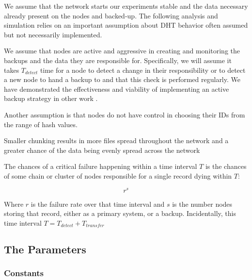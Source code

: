 
We assume that the network starts our experiments stable and the data necessary already present on the nodes and backed-up.
The following analysis and simulation relies on an important assumption about DHT behavior often assumed but not necessarily implemented.

We assume that nodes are active and aggressive in creating and monitoring the backups and the data they are responsible for.
Specifically, we will assume it takes  $T_{detect}$ time for a node to detect a change in their responsibility or to detect a new node to hand a backup to and that this check is performed regularly. 
We have demonstrated the effectiveness and viability of implementing an active backup strategy in other work \cite{chordreduce} \cite{brendanBackup} \cite{urdht}.


Another assumption is that nodes do not have control in choosing their IDs from the range of hash values.

Smaller chunking results in more files spread throughout the  network and a greater chance of the data being evenly spread across the network 

The chances of a critical failure happening within a time interval $ T $ is the chances of some chain or cluster of nodes responsible for a single record dying within $ T $:

$$r^{s}$$

Where $ r $ is the failure rate over that time interval and $s$ is the number nodes storing that record, either as a primary system, or a backup.
Incidentally, this time interval $T = T_{detect} + T_{transfer} $



\subsection{The Parameters}

\subsubsection{Constants}

